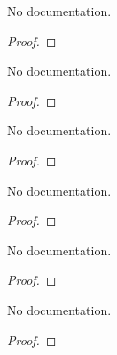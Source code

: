 \begin{lemma}\label{one_iter}
        \leanok
                No documentation.
    \end{lemma}

\begin{proof}
    \leanok
\end{proof}

\begin{theorem}\label{nesterov_algorithm_smooth}
        \leanok
                No documentation.
    \end{theorem}

\begin{proof}
    \leanok
\end{proof}

\begin{lemma}\label{dot_mul_eq_transpose_mul_dot}
        \leanok
                No documentation.
    \end{lemma}

\begin{proof}
    \leanok
\end{proof}

\begin{lemma}\label{mulVec_sub}
        \leanok
                No documentation.
    \end{lemma}

\begin{proof}
    \leanok
\end{proof}

\begin{lemma}\label{norm2eq_dot}
        \leanok
                No documentation.
    \end{lemma}

\begin{proof}
    \leanok
\end{proof}

\begin{lemma}\label{real_inner_eq_dot}
        \leanok
                No documentation.
    \end{lemma}

\begin{proof}
    \leanok
\end{proof}

